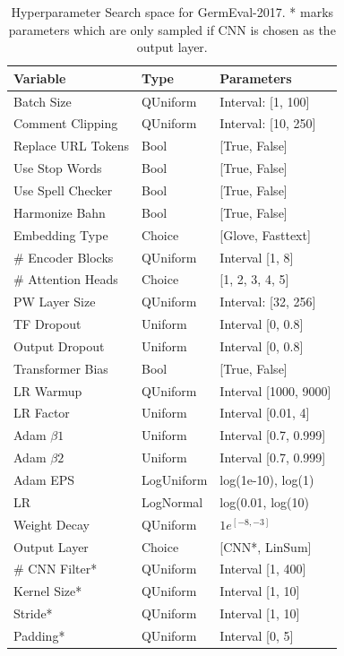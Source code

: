 \begin{table}[]
	\centering
	\begin{tabular}{@{}lll@{}}
	\toprule
	Variable           & Type       & Parameters                \\ \midrule
	Batch Size         & QUniform   & Interval: {[}1, 100{]}    \\
	Comment Clipping   & QUniform   & Interval: {[}10, 250{]}   \\
	Replace URL Tokens & Bool       & {[}True, False{]}         \\
	Use Stop Words     & Bool       & {[}True, False{]}         \\
	Use Spell Checker  & Bool       & {[}True, False{]}         \\
	Harmonize Bahn     & Bool       & {[}True, False{]}         \\
	Embedding Type     & Choice     & {[}Glove, Fasttext{]}     \\
	\# Encoder Blocks  & QUniform   & Interval {[}1, 8{]}       \\
	\# Attention Heads & Choice     & {[}1, 2, 3, 4, 5{]}       \\
	PW Layer Size      & QUniform   & Interval: {[}32, 256{]}   \\
	TF Dropout         & Uniform    & Interval {[}0, 0.8{]}     \\
	Output Dropout     & Uniform    & Interval {[}0, 0.8{]}     \\
	Transformer Bias   & Bool       & {[}True, False{]}         \\
	LR Warmup          & QUniform   & Interval {[}1000, 9000{]} \\
	LR Factor          & Uniform    & Interval {[}0.01, 4{]}    \\
	Adam $\beta 1$        & Uniform    & Interval {[}0.7, 0.999{]} \\
	Adam $\beta 2$        & Uniform    & Interval {[}0.7, 0.999{]} \\
	Adam EPS           & LogUniform & log(1e-10), log(1)        \\
	LR                 & LogNormal  & log(0.01, log(10)         \\
	Weight Decay       & QUniform   & $1e^{[-8, -3]}$       \\
	Output Layer       & Choice     & {[}CNN*, LinSum{]}        \\
	\# CNN Filter*     & QUniform   & Interval {[}1, 400{]}     \\
	Kernel Size*       & QUniform   & Interval {[}1, 10{]}      \\
	Stride*            & QUniform   & Interval {[}1, 10{]}      \\
	Padding*           & QUniform   & Interval {[}0, 5{]}       \\ \bottomrule
	\end{tabular}
	\caption{Hyperparameter Search space for GermEval-2017. * marks parameters which are only sampled if CNN is chosen as the output layer.}
	\label{tab:08_hpSpace}	
\end{table}